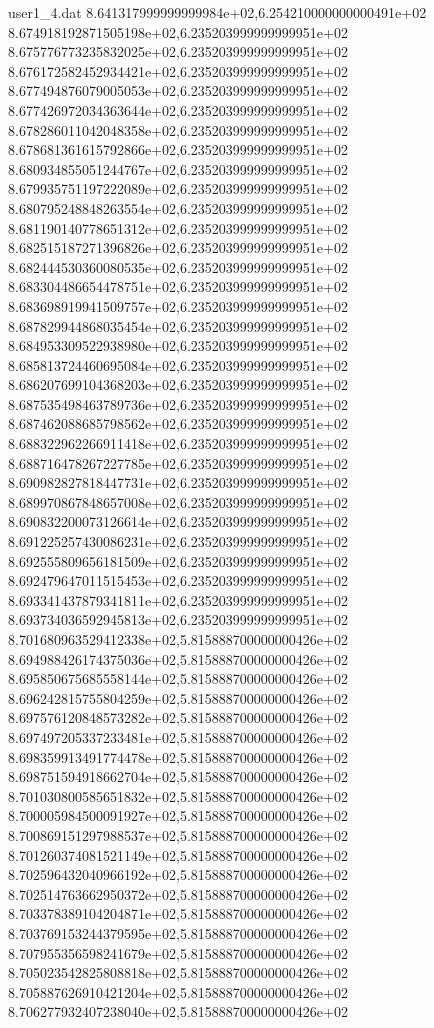 \begin{filecontents}{user1_4.dat}
8.641317999999999984e+02,6.254210000000000491e+02
8.674918192871505198e+02,6.235203999999999951e+02
8.675776773235832025e+02,6.235203999999999951e+02
8.676172582452934421e+02,6.235203999999999951e+02
8.677494876079005053e+02,6.235203999999999951e+02
8.677426972034363644e+02,6.235203999999999951e+02
8.678286011042048358e+02,6.235203999999999951e+02
8.678681361615792866e+02,6.235203999999999951e+02
8.680934855051244767e+02,6.235203999999999951e+02
8.679935751197222089e+02,6.235203999999999951e+02
8.680795248848263554e+02,6.235203999999999951e+02
8.681190140778651312e+02,6.235203999999999951e+02
8.682515187271396826e+02,6.235203999999999951e+02
8.682444530360080535e+02,6.235203999999999951e+02
8.683304486654478751e+02,6.235203999999999951e+02
8.683698919941509757e+02,6.235203999999999951e+02
8.687829944868035454e+02,6.235203999999999951e+02
8.684953309522938980e+02,6.235203999999999951e+02
8.685813724460695084e+02,6.235203999999999951e+02
8.686207699104368203e+02,6.235203999999999951e+02
8.687535498463789736e+02,6.235203999999999951e+02
8.687462088685798562e+02,6.235203999999999951e+02
8.688322962266911418e+02,6.235203999999999951e+02
8.688716478267227785e+02,6.235203999999999951e+02
8.690982827818447731e+02,6.235203999999999951e+02
8.689970867848657008e+02,6.235203999999999951e+02
8.690832200073126614e+02,6.235203999999999951e+02
8.691225257430086231e+02,6.235203999999999951e+02
8.692555809656181509e+02,6.235203999999999951e+02
8.692479647011515453e+02,6.235203999999999951e+02
8.693341437879341811e+02,6.235203999999999951e+02
8.693734036592945813e+02,6.235203999999999951e+02
8.701680963529412338e+02,5.815888700000000426e+02
8.694988426174375036e+02,5.815888700000000426e+02
8.695850675685558144e+02,5.815888700000000426e+02
8.696242815755804259e+02,5.815888700000000426e+02
8.697576120848573282e+02,5.815888700000000426e+02
8.697497205337233481e+02,5.815888700000000426e+02
8.698359913491774478e+02,5.815888700000000426e+02
8.698751594918662704e+02,5.815888700000000426e+02
8.701030800585651832e+02,5.815888700000000426e+02
8.700005984500091927e+02,5.815888700000000426e+02
8.700869151297988537e+02,5.815888700000000426e+02
8.701260374081521149e+02,5.815888700000000426e+02
8.702596432040966192e+02,5.815888700000000426e+02
8.702514763662950372e+02,5.815888700000000426e+02
8.703378389104204871e+02,5.815888700000000426e+02
8.703769153244379595e+02,5.815888700000000426e+02
8.707955356598241679e+02,5.815888700000000426e+02
8.705023542825808818e+02,5.815888700000000426e+02
8.705887626910421204e+02,5.815888700000000426e+02
8.706277932407238040e+02,5.815888700000000426e+02

\end{filecontents}
